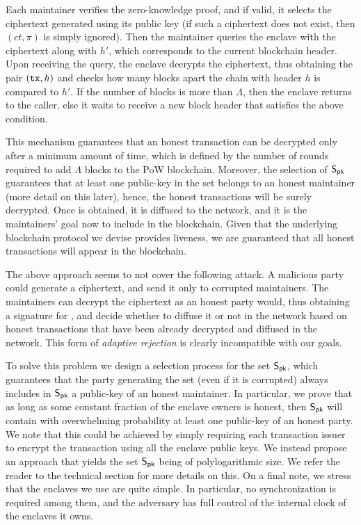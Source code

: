 Each maintainer verifies the zero-knowledge proof, and if valid, it selects the ciphertext generated using its public key \pk (if such a ciphertext does not exist, then $(ct, \pi)$ is simply ignored).
%
Then the maintainer queries the enclave with the ciphertext along with $h'$, which corresponds to the current blockchain header.
%
Upon receiving the query, the enclave decrypts the ciphertext, thus obtaining the pair $(\mathtt{tx}, h)$ and checks how many blocks apart the chain with header $h$ is compared to $h'$.
%
If the number of blocks is more than $\Lambda$, then the enclave returns \tx to the caller, else it waits to receive a new block header that satisfies the above condition.

This mechanism guarantees that an honest transaction can be decrypted only after a minimum amount of time, which is defined by the number of rounds required to add $\Lambda$ blocks to the PoW blockchain.
%
Moreover, the selection of $\mathsf{S}_\mathsf{pk}$ guarantees that at least one public-key in the set belongs to an honest maintainer (more detail on this later), hence, the honest transactions will be surely decrypted.
%
Once \tx is obtained, it is diffused to the network, and it is the maintainers' goal now to include \tx in the blockchain.
%
Given that the underlying blockchain protocol we devise provides liveness, we are guaranteed that all honest transactions will appear in the blockchain.

The above approach seems to not cover the following attack.
%
A malicious party could generate a ciphertext, and send it only to corrupted maintainers.
%
The maintainers can decrypt the ciphertext as an honest party would, thus obtaining a signature for \tx, and decide whether to diffuse it or not in the network based on honest transactions that have been already decrypted and diffused in the network.
%
This form of \emph{adaptive rejection} is clearly incompatible with our goals.

To solve this problem we design a selection process for the set $\mathsf{S}_\mathsf{pk}$, which guarantees that the party generating the set (even if it is corrupted) always includes in $\mathsf{S}_\mathsf{pk}$ a public-key of an honest maintainer.
%
In particular, we prove that as long as some constant fraction of the enclave owners is honest, then $\mathsf{S}_\mathsf{pk}$ will contain with overwhelming probability at least one public-key of an honest party.
%
We note that this could be achieved by simply requiring each transaction issuer to encrypt the transaction using all the enclave public keys.
%
We instead propose an approach that yields the set $\mathsf{S}_\mathsf{pk}$ being of polylogarithmic size.
%
We refer the reader to the technical section for more details on this.
%
On a final note, we stress that the enclaves we use are quite simple.
%
In particular, no synchronization is required among them, and the adversary has full control of the internal clock of the enclaves it owns.

